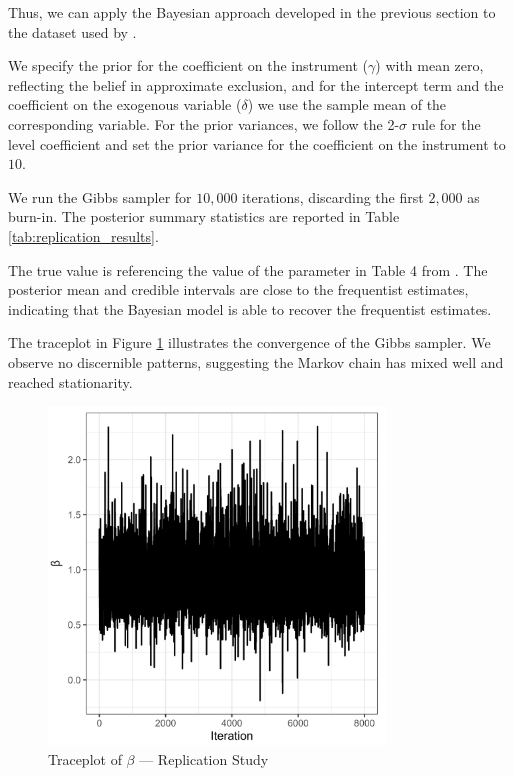 Thus, we can apply the Bayesian approach developed in the previous section to the dataset used by \cite{acemogluColonialOriginsComparative2001}. 

We specify the prior for the coefficient on the instrument ($\gamma$) with mean zero, reflecting the belief in approximate exclusion, and for the intercept term and the coefficient on the exogenous variable ($\delta$) we use the sample mean of the corresponding variable. For the prior variances, we follow the 2-$\sigma$ rule for the level coefficient and set the prior variance for the coefficient on the instrument to $10$. 

We run the Gibbs sampler for $10{,}000$ iterations, discarding the first $2{,}000$ as burn-in. The posterior summary statistics are reported in Table \ref{tab:replication_results}.



The true value is referencing the value of the parameter in Table 4 from \cite{acemogluColonialOriginsComparative2001}. The posterior mean and credible intervals are close to the frequentist estimates, indicating that the Bayesian model is able to recover the frequentist estimates. 

The traceplot in Figure \ref{fig:replication_traceplot} illustrates the convergence of the Gibbs sampler. We observe no discernible patterns, suggesting the Markov chain has mixed well and reached stationarity.

\begin{figure}[H]
\centering
\includegraphics[width=0.8\textwidth]{../figures/acemoglu/trace_beta.png}
\caption{Traceplot of $\beta$ --- Replication Study}
\label{fig:replication_traceplot}
\end{figure}

